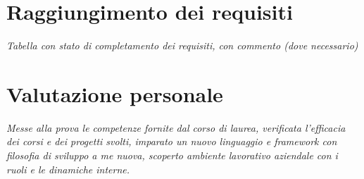\section{Raggiungimento dei requisiti}
\emph{Tabella con stato di completamento dei requisiti, con commento (dove necessario)}

\section{Valutazione personale}
\emph{Messe alla prova le competenze fornite dal corso di laurea, verificata l'efficacia dei corsi e dei progetti svolti, imparato un nuovo linguaggio e framework con filosofia di sviluppo a me nuova, scoperto ambiente lavorativo aziendale con i ruoli e le dinamiche interne.}
